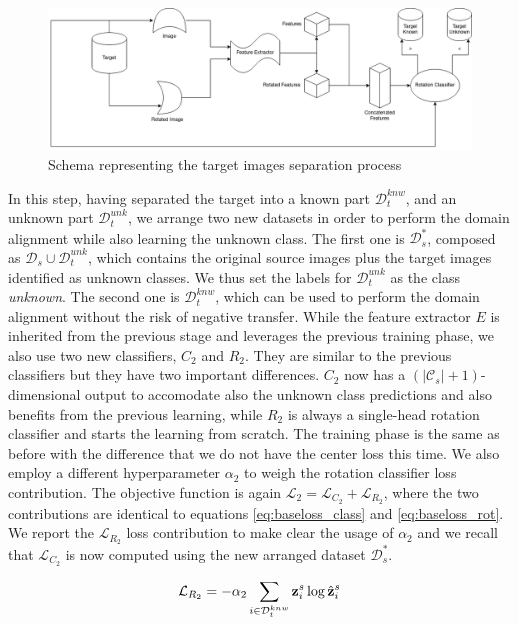 \documentclass[10pt,twocolumn,letterpaper]{article}
\begin{document}
\begin{figure}
  \includegraphics[width=\textwidth ]{scheme.png}
  \caption{\label{fig:separation} Schema representing the target images separation process}
\end{figure}

In this step,
having separated the target into a known part $\mathcal{D}_t^{knw}$,
and an unknown part $\mathcal{D}_t^{unk}$,
we arrange two new datasets in order to perform the domain alignment while also learning
the unknown class.
The first one is $\mathcal{D}_s^*$, composed as $\mathcal{D}_s \cup \mathcal{D}_t^{unk}$,
which contains the original source images plus the target images identified as unknown classes.
We thus set the labels for $\mathcal{D}_t^{unk}$ as the class {\it unknown}.
The second one is $\mathcal{D}_t^{knw}$, which can be used to perform the domain alignment
without the risk of negative transfer.
While the feature extractor $E$ is inherited from the previous stage and leverages the previous training phase,
we also use two new classifiers,
$C_2$ and $R_2$.
They are similar to the previous classifiers but they have two important differences.
$C_2$ now has a $(|\mathcal{C}_s|+1)$-dimensional output to accomodate also the unknown class predictions and also
benefits from the previous learning,
while $R_2$ is always a single-head rotation classifier and starts the learning from scratch.
The training phase is the same as before with the difference that we do not have the center loss this time.
We also employ a different hyperparameter $\alpha_2$ to weigh the rotation classifier loss contribution.
The objective function is again $\mathcal{L}_2 = \mathcal{L}_{C_2} + \mathcal{L}_{R_2}$,
where the two contributions are identical to equations \ref{eq:baseloss_class} and \ref{eq:baseloss_rot}.
We report the $\mathcal{L}_{R_2}$ loss contribution to make clear the usage of $\alpha_2$ and we
recall that $\mathcal{L}_{C_2}$ is now computed using the new arranged dataset $\mathcal{D}_s^*$.

\begin{equation}
  \mathcal{L}_{R_2} = -\alpha_2\sum_{i\in\mathcal{D}_t^{knw}} {\bf z}_i^s \log \hat{{\bf z}}_i^s
  \label{eq:baseloss_rot2}
\end{equation}
\end{document}
